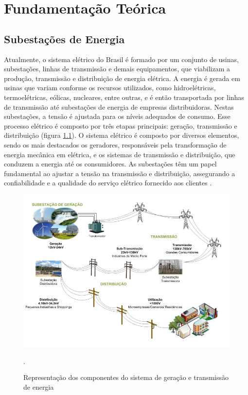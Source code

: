 \chapter{Fundamentação Teórica}

\section{Subestações de Energia}
\label{sec:subestacao}

Atualmente, o sistema elétrico do Brasil é formado por um conjunto de usinas, subestações, linhas de transmissão e demais equipamentos, que viabilizam a produção, transmissão e distribuição de energia elétrica. A energia é gerada em usinas que variam conforme os recursos utilizados, como hidroelétricas, termoelétricas, eólicas, nucleares, entre outras, e é então transportada por linhas de transmissão até subestações de energia de empresas distribuidoras. Nestas subestações, a tensão é ajustada para os níveis adequados de consumo. Esse processo elétrico é composto por três etapas principais: geração, transmissão e distribuição (figura \ref{fig:substation}). O sistema elétrico é composto por diversos elementos, sendo os mais destacados os geradores, responsáveis pela transformação de energia mecânica em elétrica, e os sistemas de transmissão e distribuição, que conduzem a energia até os consumidores. As subestações têm um papel fundamental ao ajustar a tensão na transmissão e distribuição, assegurando a confiabilidade e a qualidade do serviço elétrico fornecido aos clientes  \cite{lopes2012smart}.

\begin{figure}[!h]
    \centering
    \begin{minipage}{0.9\linewidth}
    \centering
    \captionsetup{justification=centering,margin=0.5cm,font=small}
    \includegraphics[width=0.7\linewidth]{img/cap2/substation.jpeg}
    \caption{Representação dos componentes do sistema de geração e transmissão de energia \cite{lopes2012smart}}.
    \label{fig:substation}
    \end{minipage}
\end{figure}

